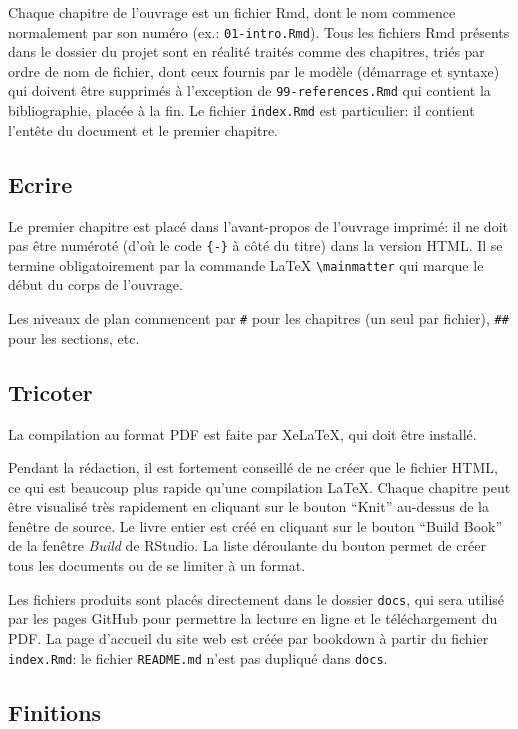 \documentclass[
  12pt,
  french,
  a4paper,
  extrafontsizes,onecolumn,openright
  ]{memoir}
\begin{document}
Chaque chapitre de l'ouvrage est un fichier Rmd, dont le nom commence normalement par son numéro (ex.: \texttt{01-intro.Rmd}).
Tous les fichiers Rmd présents dans le dossier du projet sont en réalité traités comme des chapitres, triés par ordre de nom de fichier, dont ceux fournis par le modèle (démarrage et syntaxe) qui doivent être supprimés à l'exception de \texttt{99-references.Rmd} qui contient la bibliographie, placée à la fin.
Le fichier \texttt{index.Rmd} est particulier: il contient l'entête du document et le premier chapitre.

\subsection{Ecrire}\label{ecrire-2}

Le premier chapitre est placé dans l'avant-propos de l'ouvrage imprimé: il ne doit pas être numéroté (d'où le code \texttt{\{-\}} à côté du titre) dans la version HTML.
Il se termine obligatoirement par la commande LaTeX \texttt{\textbackslash{}mainmatter} qui marque le début du corps de l'ouvrage.

Les niveaux de plan commencent par \texttt{\#} pour les chapitres (un seul par fichier), \texttt{\#\#} pour les sections, etc.

\subsection{Tricoter}\label{tricoter-1}

La compilation au format PDF est faite par XeLaTeX, qui doit être installé.

Pendant la rédaction, il est fortement conseillé de ne créer que le fichier HTML, ce qui est beaucoup plus rapide qu'une compilation LaTeX.
Chaque chapitre peut être visualisé très rapidement en cliquant sur le bouton \enquote{Knit} au-dessus de la fenêtre de source.
Le livre entier est créé en cliquant sur le bouton \enquote{Build Book} de la fenêtre \emph{Build} de RStudio.
La liste déroulante du bouton permet de créer tous les documents ou de se limiter à un format.

Les fichiers produits sont placés directement dans le dossier \texttt{docs}, qui sera utilisé par les pages GitHub pour permettre la lecture en ligne et le téléchargement du PDF.
La page d'accueil du site web est créée par bookdown à partir du fichier \texttt{index.Rmd}: le fichier \texttt{README.md} n'est pas dupliqué dans \texttt{docs}.

\subsection{Finitions}\label{finitions}
\end{document}
